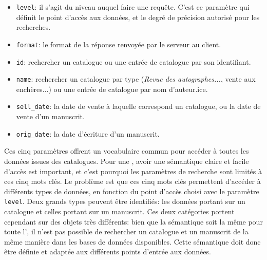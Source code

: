 \begin{itemize}
	\item \texttt{level}: il s'agit du niveau auquel faire une requête. C'est ce paramètre qui définit le point d'accès aux données, et le degré de précision autorisé pour les recherches. 
	\item \texttt{format}: le format de la réponse renvoyée par le serveur au client.
	\item \texttt{id}: rechercher un catalogue ou une entrée de catalogue par son identifiant.
	\item \texttt{name}: rechercher un catalogue par type (\textit{Revue des autographes...}, vente aux enchères...) ou une entrée de catalogue par nom d'auteur.ice.
	\item \texttt{sell\_date}: la date de vente à laquelle correspond un catalogue, ou la date de vente d'un manuscrit.
	\item \texttt{orig\_date}: la date d'écriture d'un manuscrit.
\end{itemize}

Ces cinq paramètres offrent un vocabulaire commun pour accéder à toutes les données issues des catalogues. Pour une \api{}, avoir une sémantique claire et facile d'accès est important, et c'est pourquoi les paramètres de recherche sont limités à ces cinq mots clés. Le problème est que ces cinq mots clés permettent d'accéder à différents types de données, en fonction du point d'accès choisi avec le paramètre \texttt{level}. Deux grands types peuvent être identifiés: les données portant sur un catalogue et celles portant sur un manuscrit. Ces deux catégories portent cependant sur des objets très différents: bien que la sémantique soit la même pour toute l'\api{}, il n'est pas possible de rechercher un catalogue et un manuscrit de la même manière dans les bases de données disponibles. Cette sémantique doit donc être définie et adaptée aux différents points d'entrée aux données.

